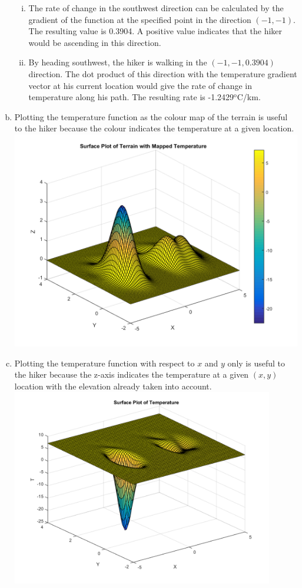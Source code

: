 \documentclass[12pt,onecolumn]{article}
\begin{document}
\begin{enumerate}[a.]
\begin{enumerate}[i.]
\item The rate of change in the southwest direction can be calculated by the gradient of the function at the specified point in the direction $(-1,-1)$. The resulting value is 0.3904. A positive value indicates that the hiker would be ascending in this direction.
\item By heading southwest, the hiker is walking in the $(-1,-1,0.3904)$ direction. The dot product of this direction with the temperature gradient vector at his current location would give the rate of change in temperature along his path. The resulting rate is -1.2429$^{\text{o}}$C/km.
\end{enumerate}
\newpage
\item Plotting the temperature function as the colour map of the terrain is useful to the hiker because the colour indicates the temperature at a given location.\\
\includegraphics[width=\textwidth]{SurfaceColor}
\item Plotting the temperature function with respect to $x$ and $y$ only is useful to the hiker because the z-axis indicates the temperature at a given $(x,y)$ location with the elevation already taken into account.\\
\includegraphics[width=0.9\textwidth]{Temp}

\end{enumerate}
\end{document}
